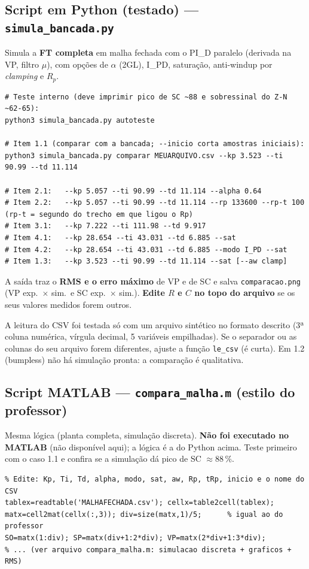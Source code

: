 \documentclass[11pt,a4paper]{article}
\begin{document}
\subsection{Script em Python (testado) --- \texttt{simula\_bancada.py}}
Simula a \textbf{FT completa} em malha fechada com o PI\_D paralelo (derivada na VP, filtro $\mu$), com opções de $\alpha$ (2GL), I\_PD, saturação, anti-windup por \emph{clamping} e $R_p$.
\begin{lstlisting}
# Teste interno (deve imprimir pico de SC ~88 e sobressinal do Z-N ~62-65):
python3 simula_bancada.py autoteste

# Item 1.1 (comparar com a bancada; --inicio corta amostras iniciais):
python3 simula_bancada.py comparar MEUARQUIVO.csv --kp 3.523 --ti 90.99 --td 11.114

# Item 2.1:   --kp 5.057 --ti 90.99 --td 11.114 --alpha 0.64
# Item 2.2:   --kp 5.057 --ti 90.99 --td 11.114 --rp 133600 --rp-t 100   (rp-t = segundo do trecho em que ligou o Rp)
# Item 3.1:   --kp 7.222 --ti 111.98 --td 9.917
# Item 4.1:   --kp 28.654 --ti 43.031 --td 6.885 --sat
# Item 4.2:   --kp 28.654 --ti 43.031 --td 6.885 --modo I_PD --sat
# Item 1.3:   --kp 3.523 --ti 90.99 --td 11.114 --sat [--aw clamp]
\end{lstlisting}
A saída traz o \textbf{RMS e o erro máximo} de VP e de SC e salva \texttt{comparacao.png} (VP exp.\ $\times$ sim.\ e SC exp.\ $\times$ sim.). \textbf{Edite $R$ e $C$ no topo do arquivo} se os seus valores medidos forem outros.
\begin{alerta}A leitura do CSV foi testada só com um arquivo sintético no formato descrito (3ª coluna numérica, vírgula decimal, 5 variáveis empilhadas). Se o separador ou as colunas do seu arquivo forem diferentes, ajuste a função \texttt{le\_csv} (é curta). Em 1.2 (bumpless) não há simulação pronta: a comparação é qualitativa.\end{alerta}
\subsection{Script MATLAB --- \texttt{compara\_malha.m} (estilo do professor)}
Mesma lógica (planta completa, simulação discreta). \textbf{Não foi executado no MATLAB} (não disponível aqui); a lógica é a do Python acima. Teste primeiro com o caso 1.1 e confira se a simulação dá pico de SC $\approx88\,\%$.
\begin{lstlisting}
% Edite: Kp, Ti, Td, alpha, modo, sat, aw, Rp, tRp, inicio e o nome do CSV
tablex=readtable('MALHAFECHADA.csv'); cellx=table2cell(tablex);
matx=cell2mat(cellx(:,3)); div=size(matx,1)/5;      % igual ao do professor
SO=matx(1:div); SP=matx(div+1:2*div); VP=matx(2*div+1:3*div);
% ... (ver arquivo compara_malha.m: simulacao discreta + graficos + RMS)
\end{lstlisting}
\end{document}
